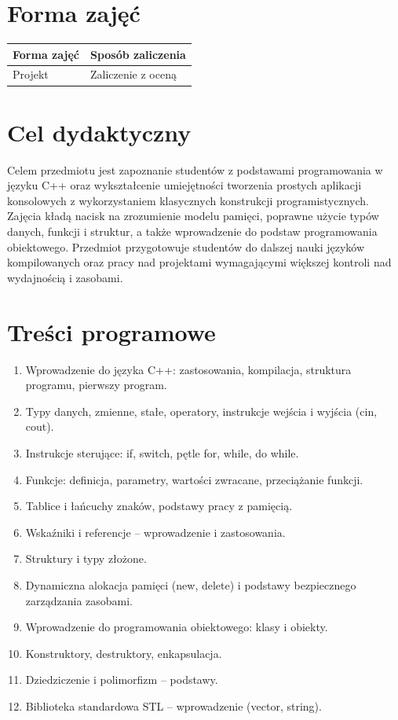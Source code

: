 \documentclass[12pt, a4paper]{article}
\begin{document}
\section{Forma zajęć}

\begin{tabular}{ll}
  \hline
  \textbf{Forma zajęć} & \textbf{Sposób zaliczenia} \\
  \hline
  Projekt & Zaliczenie z oceną \\
  \hline
\end{tabular}

\section{Cel dydaktyczny}

Celem przedmiotu jest zapoznanie studentów z podstawami programowania w języku C++ oraz wykształcenie umiejętności tworzenia prostych aplikacji konsolowych z wykorzystaniem klasycznych konstrukcji programistycznych. Zajęcia kładą nacisk na zrozumienie modelu pamięci, poprawne użycie typów danych, funkcji i struktur, a także wprowadzenie do podstaw programowania obiektowego. Przedmiot przygotowuje studentów do dalszej nauki języków kompilowanych oraz pracy nad projektami wymagającymi większej kontroli nad wydajnością i zasobami.

\section{Treści programowe}

\begin{enumerate}
  \item Wprowadzenie do języka C++: zastosowania, kompilacja, struktura programu, pierwszy program.
  \item Typy danych, zmienne, stałe, operatory, instrukcje wejścia i wyjścia (cin, cout).
  \item Instrukcje sterujące: if, switch, pętle for, while, do while.
  \item Funkcje: definicja, parametry, wartości zwracane, przeciążanie funkcji.
  \item Tablice i łańcuchy znaków, podstawy pracy z pamięcią.
  \item Wskaźniki i referencje – wprowadzenie i zastosowania.
  \item Struktury i typy złożone.
  \item Dynamiczna alokacja pamięci (new, delete) i podstawy bezpiecznego zarządzania zasobami.
  \item Wprowadzenie do programowania obiektowego: klasy i obiekty.
  \item  Konstruktory, destruktory, enkapsulacja.
  \item  Dziedziczenie i polimorfizm – podstawy.
  \item  Biblioteka standardowa STL – wprowadzenie (vector, string).
\end{enumerate}
\end{document}

